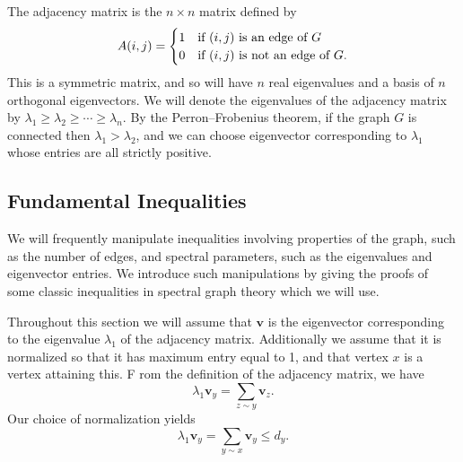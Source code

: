The adjacency matrix is the $n \times n$ matrix defined by
\[
 A(i,j) =
  \begin{cases} 
      \hfill 1 \hfill & \text{if $(i,j)$ is an edge of $G$} \\
      \hfill 0 \hfill & \text{if $(i,j)$ is not an edge of $G$.} \\
  \end{cases}
\]
This is a symmetric matrix, and so will have $n$ real eigenvalues and a basis of
$n$ orthogonal eigenvectors.  We will denote the eigenvalues of the adjacency matrix
by $\lambda_1 \geq \lambda_2 \geq \cdots \geq \lambda_n$.  By the Perron--Frobenius theorem,
if the graph $G$ is connected then $\lambda_1 > \lambda_2$, and we can choose
eigenvector corresponding to $\lambda_1$ whose entries are all strictly positive.





\subsection{Fundamental Inequalities}

We will frequently manipulate inequalities involving properties of the graph, such as the number
of edges, and spectral parameters, such as the eigenvalues and eigenvector entries.
We introduce such manipulations by giving the proofs of some classic inequalities in spectral graph
theory which we will use.


Throughout this section we will assume that $\mathbf{v}$ is the eigenvector
corresponding to the eigenvalue $\lambda_1$ of the adjacency matrix.  Additionally we assume that
it is normalized so that it has maximum entry equal to 1, and that vertex $x$ is a vertex attaining this.  F
rom the definition of the adjacency matrix, we have
\begin{equation}
  \lambda_1 \mathbf{v}_y = \sum_{z \sim y} \mathbf{v}_z .
\end{equation}
Our choice of normalization yields
\begin{equation}
  \lambda_1 \mathbf{v}_y = \sum_{y \sim x} \mathbf{v}_y\leq d_y .
\end{equation}


